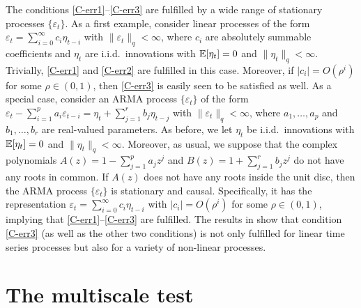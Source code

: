 The conditions \ref{C-err1}--\ref{C-err3} are fulfilled by a wide range of stationary processes $\{\varepsilon_t\}$. As a first example, consider linear processes of the form $\varepsilon_t = \sum\nolimits_{i=0}^{\infty} c_i \eta_{t-i}$ with $\| \varepsilon_t \|_q < \infty$, where $c_i$ are absolutely summable coefficients and $\eta_t$ are i.i.d.\ innovations with $\mathbb{E}[\eta_t] = 0$ and $\| \eta_t\|_q < \infty$. Trivially, \ref{C-err1} and \ref{C-err2} are fulfilled in this case. Moreover, if $|c_i| = O(\rho^i)$ for some $\rho \in (0,1)$, then \ref{C-err3} is easily seen to be satisfied as well. As a special case, consider an ARMA process $\{\varepsilon_t\}$ of the form $\varepsilon_t - \sum\nolimits_{i=1}^p a_i \varepsilon_{t-i} = \eta_t + \sum\nolimits_{j=1}^r b_j \eta_{t-j}$  with $\| \varepsilon_t \|_q < \infty$, where $a_1,\ldots,a_p$ and $b_1,\ldots,b_r$ are real-valued parameters. As before, we let $\eta_t$ be i.i.d.\ innovations with $\mathbb{E}[\eta_t] = 0$ and $\| \eta_t\|_q < \infty$. Moreover, as usual, we suppose that the complex polynomials $A(z) = 1 - \sum\nolimits_{j=1}^p a_jz^j$ and $B(z) = 1 + \sum\nolimits_{j=1}^r b_jz^j$ do not have any roots in common. If $A(z)$ does not have any roots inside the unit disc, then the ARMA process $\{ \varepsilon_t \}$ is stationary and causal. Specifically, it has the representation $\varepsilon_t = \sum\nolimits_{i=0}^{\infty} c_i \eta_{t-i}$ with $|c_i| = O(\rho^i)$ for some $\rho \in (0,1)$, implying that \ref{C-err1}--\ref{C-err3} are fulfilled. The results in \cite{WuShao2004} show that condition \ref{C-err3} (as well as the other two conditions) is not only fulfilled for linear time series processes but also for a variety of non-linear processes. 



\section{The multiscale test}\label{sec-method}


